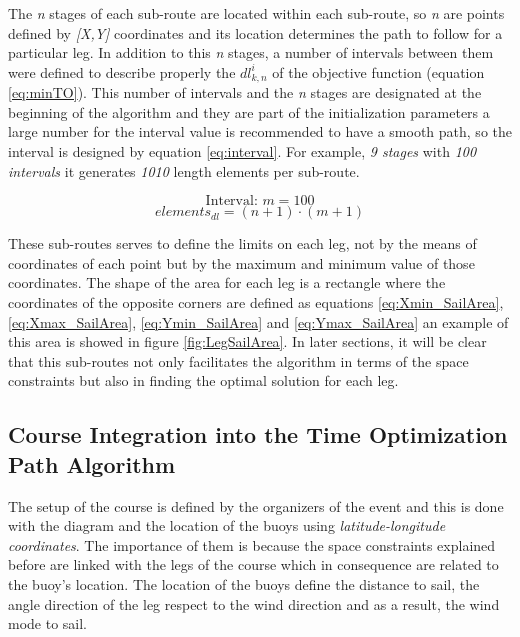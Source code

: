 The \textit{n} stages of each sub-route are located within each sub-route, so \textit{n} are points defined by \textit{[X,Y]} coordinates and its location determines the path to follow for a particular leg. In addition to this \textit{n} stages, a number of intervals between them were defined to describe properly the $dl_{k,n}^{i}$ of the objective function (equation \ref{eq:minTO}).  This number of intervals and the \textit{n} stages are designated at the beginning of the algorithm and they are part of the initialization parameters a large number for the interval value is recommended to have a smooth path, so the interval is designed by equation \ref{eq:interval}. For example, \textit{9 stages} with \textit{100 intervals} it generates \textit{1010} length elements per sub-route. \par 

\begin{equation} \label{eq:interval}
   \text{Interval: }  m=100
\end{equation}
\begin{equation} \label{eq:interval-example}
  elements_{dl}=(n+1) \cdot (m+1)
\end{equation}

These sub-routes serves to define the limits on each leg, not by the means of coordinates of each point but by the maximum and minimum value of those coordinates. The shape of the area for each leg is a rectangle where the coordinates of the opposite corners are defined as equations \ref{eq:Xmin_SailArea}, \ref{eq:Xmax_SailArea}, \ref{eq:Ymin_SailArea} and \ref{eq:Ymax_SailArea} an example of this area is showed in figure \ref{fig:LegSailArea}. In later sections, it will be clear that this sub-routes not only facilitates the algorithm in terms of the space constraints but also in finding the optimal solution for each leg. \par 

\subsection{Course Integration into the Time Optimization Path Algorithm} \label{sec:Coure_LegIntegration}

The setup of the course is defined by the organizers of the event and this is done with the diagram and the location of the buoys using \textit{latitude-longitude coordinates}. The importance of them is because the space constraints explained before are linked with the legs of the course which in consequence are related to the buoy's location. The location of the buoys define the distance to sail, the angle direction of the leg respect to the wind direction and as a result, the wind mode to sail. \par 

